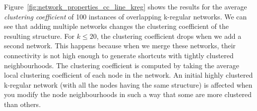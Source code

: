 \documentclass[preprint,number]{elsarticle}
\begin{document}
\noindent Figure~\ref{fig:network_properties_cc_line_kreg} shows the results for the average \textit{clustering coefficient} of 100 instances of overlapping k-regular networks. We can see that adding multiple networks changes the clustering coefficient of the resulting structure. For $k \le 20$, the clustering coefficient drops when we add a second network. This happens because when we merge these networks, their connectivity is not high enough to generate shortcuts with tightly clustered neighbourhoods. The clustering coefficient is computed by taking the average local clustering coefficient of each node in the network. An initial highly clustered k-regular network (with all the nodes having the same structure) is affected when you modify the node neighbourhoods in such a way that some are more clustered than others.
\end{document}
